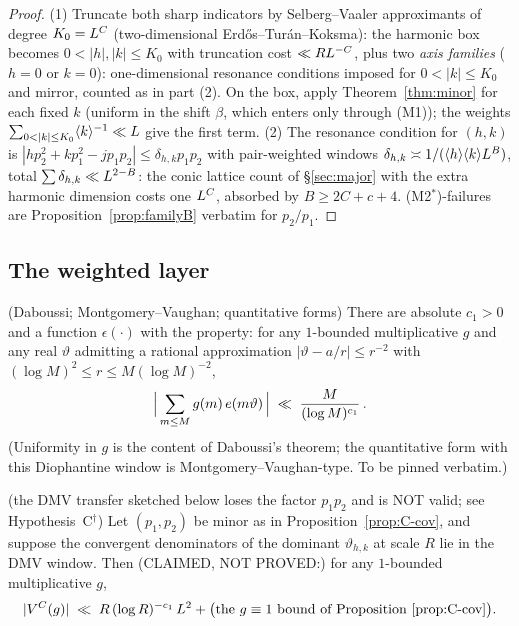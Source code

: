 \begin{proof}
(1) Truncate both sharp indicators by Selberg--Vaaler approximants of
degree $K_0=L^{C}$ (two-dimensional Erd\H os--Tur\'an--Koksma):
the harmonic box becomes $0<|h|,|k|\le K_0$ with truncation cost
$\ll RL^{-C}$, plus two \emph{axis families} ($h=0$ or $k=0$):
one-dimensional resonance conditions imposed for
$0<|k|\le K_0$ and mirror, counted as in part (2). On the box, apply
Theorem~\ref{thm:minor} for each fixed $k$ (uniform in the shift
$\beta$, which enters only through (M1)); the weights
$\sum_{0<|k|\le K_0}\langle k\rangle^{-1}\ll\Llog$ give the first
term. (2) The resonance condition for $(h,k)$ is
$|hp_2^{2}+kp_1^{2}-jp_1p_2|\le\delta_{h,k}p_1p_2$ with pair-weighted
windows $\delta_{h,k}\asymp1/(\langle h\rangle\langle k\rangle
L^{B})$, total $\sum\delta_{h,k}\ll L^{2-B}$: the conic lattice
count of \S\ref{sec:major} with the extra harmonic dimension costs one
$L^{C}$, absorbed by $B\ge2C+c+4$. (M2$^*$)-failures are
Proposition~\ref{prop:familyB} verbatim for $p_2/p_1$.
\end{proof}

\subsection{The weighted layer}

\begin{lemma}\label{lem:DMV}
\statusN{} (Daboussi; Montgomery--Vaughan; quantitative forms)\quad
There are absolute $c_1>0$ and a function $\epsilon(\cdot)$ with the
property: for any $1$-bounded multiplicative $g$ and any real
$\vartheta$ admitting a rational approximation $|\vartheta-a/r|\le
r^{-2}$ with $(\log M)^{2}\le r\le M(\log M)^{-2}$,
\[
\Big|\sum_{m\le M}g(m)\,e\!\left(m\vartheta\right)\Big|\;\ll\;
\frac{M}{(\log M)^{c_1}}\,.
\]
(Uniformity in $g$ is the content of Daboussi's theorem; the
quantitative form with this Diophantine window is
Montgomery--Vaughan-type. To be pinned verbatim.)
\end{lemma}

\begin{proposition}\label{prop:C-weighted}
\statusO{} (the DMV transfer sketched below loses the factor $p_1p_2$
and is NOT valid; see Hypothesis~C$^\dagger$)\quad
Let $(p_1,p_2)$ be minor as in Proposition~\ref{prop:C-cov}, and
suppose the convergent denominators of the dominant
$\vartheta_{h,k}$ at scale $R$ lie in the DMV window. Then
(CLAIMED, NOT PROVED:) for any $1$-bounded
multiplicative $g$,
\[
|V^{C}(g)|\;\ll\;R\,(\log R)^{-c_1}\,L^{2}
+\big(\text{the }g\equiv1\text{ bound of
Proposition~\ref{prop:C-cov}}\big).
\]
\end{proposition}

